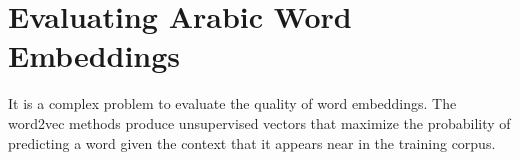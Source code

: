 \section{Evaluating Arabic Word Embeddings}

It is a complex problem to evaluate the quality of word embeddings. The word2vec methods produce unsupervised vectors that maximize the probability of predicting a word given the context that it appears near in the training corpus. 




